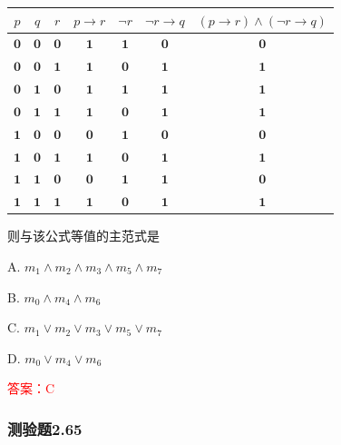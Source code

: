 \documentclass[UTF8, heading=true]{ctexart}
\begin{document}
\begin{table}[htbp]
  \centering
\begin{tabular}{c|c|c|c|c|c|c}
\hline$p$ & $q$ & $r$ & $p \rightarrow r$ & $\neg r$ & $\neg r \rightarrow q$ & $(p \rightarrow r) \wedge(\neg r \rightarrow q)$ \\
\hline $\mathbf{0}$ & $\mathbf{0}$ & $\mathbf{0}$ & $\mathbf{1}$ & $\mathbf{1}$ & $\mathbf{0}$ & $\mathbf{0}$ \\
\hline $\mathbf{0}$ & $\mathbf{0}$ & $\mathbf{1}$ & $\mathbf{1}$ & $\mathbf{0}$ & $\mathbf{1}$ & $\mathbf{1}$ \\
\hline $\mathbf{0}$ & $\mathbf{1}$ & $\mathbf{0}$ & $\mathbf{1}$ & $\mathbf{1}$ & $\mathbf{1}$ & $\mathbf{1}$ \\
\hline $\mathbf{0}$ & $\mathbf{1}$ & $\mathbf{1}$ & $\mathbf{1}$ & $\mathbf{0}$ & $\mathbf{1}$ & $\mathbf{1}$ \\
\hline $\mathbf{1}$ & $\mathbf{0}$ & $\mathbf{0}$ & $\mathbf{0}$ & $\mathbf{1}$ & $\mathbf{0}$ & $\mathbf{0}$ \\
\hline $\mathbf{1}$ & $\mathbf{0}$ & $\mathbf{1}$ & $\mathbf{1}$ & $\mathbf{0}$ & $\mathbf{1}$ & $\mathbf{1}$ \\
\hline $\mathbf{1}$ & $\mathbf{1}$ & $\mathbf{0}$ & $\mathbf{0}$ & $\mathbf{1}$ & $\mathbf{1}$ & $\mathbf{0}$ \\
\hline $\mathbf{1}$ & $\mathbf{1}$ & $\mathbf{1}$ & $\mathbf{1}$ & $\mathbf{0}$ & $\mathbf{1}$ & $\mathbf{1}$ \\
\hline
\end{tabular}
\end{table}

则与该公式等值的主范式是

A. $
m_1 \wedge m_2 \wedge m_3 \wedge m_5 \wedge m_7
$

B. $m_0 \wedge m_4 \wedge m_6$

C. $m_1 \vee m_2 \vee m_3 \vee m_5 \vee m_7$

D. $m_0 \vee m_4 \vee m_6$

\textcolor{red}{答案：C}

\subsubsection{测验题2.65}
\end{document}
